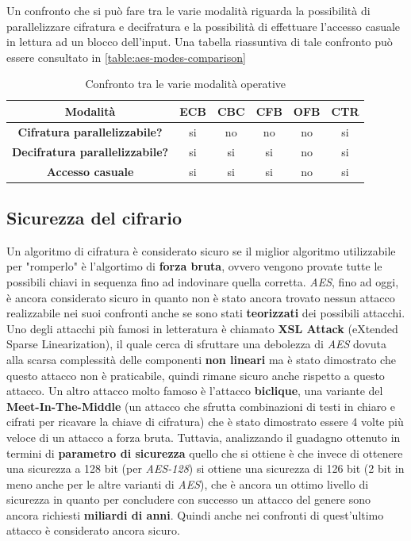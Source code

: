 \begin{itemize}
\end{itemize}

Un confronto che si può fare tra le varie modalità riguarda la possibilità di parallelizzare cifratura e decifratura e la possibilità di effettuare l'accesso casuale in lettura ad un blocco dell'input. Una tabella riassuntiva di tale confronto può essere consultato in \autoref{table:aes-modes-comparison} \cite{wikipedia_aes_modes}

\begin{table}[h]
    \centering
    \begin{tabular}[h]{| c || c | c | c | c | c |}
        \hline
        \textbf{Modalità} & \textbf{ECB} & \textbf{CBC} & \textbf{CFB} & \textbf{OFB} & \textbf{CTR} \\
        \hline
        \textbf{Cifratura parallelizzabile?} & si & no & no & no & si \\
        \hline
        \textbf{Decifratura parallelizzabile?} & si & si & si & no & si \\
        \hline
        \textbf{Accesso casuale} & si & si & si & no & si \\
        \hline
    \end{tabular}
    \caption{Confronto tra le varie modalità operative}
    \label{table:aes-modes-comparison}
\end{table}

\subsection{Sicurezza del cifrario}
Un algoritmo di cifratura è considerato sicuro se il miglior algoritmo utilizzabile per "romperlo" è l'algortimo di \textbf{forza bruta}, ovvero vengono provate tutte le possibili chiavi in sequenza fino ad indovinare quella corretta. \emph{AES}, fino ad oggi, è ancora considerato sicuro in quanto non è stato ancora trovato nessun attacco realizzabile nei suoi confronti anche se sono stati \textbf{teorizzati} dei possibili attacchi. Uno degli attacchi più famosi in letteratura è chiamato \textbf{XSL Attack} (eXtended Sparse Linearization), il quale cerca di sfruttare una debolezza di \emph{AES} dovuta alla scarsa complessità delle componenti \textbf{non lineari} ma è stato dimostrato che questo attacco non è praticabile, quindi rimane sicuro anche rispetto a questo attacco. Un altro attacco molto famoso è l'attacco \textbf{biclique}, una variante del \textbf{Meet-In-The-Middle} (un attacco che sfrutta combinazioni di testi in chiaro e cifrati per ricavare la chiave di cifratura) che è stato dimostrato essere 4 volte più veloce di un attacco a forza bruta. Tuttavia, analizzando il guadagno ottenuto in termini di \textbf{parametro di sicurezza} quello che si ottiene è che invece di ottenere una sicurezza a 128 bit (per \emph{AES-128}) si ottiene una sicurezza di 126 bit (2 bit in meno anche per le altre varianti di \emph{AES}), che è ancora un ottimo livello di sicurezza in quanto per concludere con successo un attacco del genere sono ancora richiesti \textbf{miliardi di anni}. Quindi anche nei confronti di quest'ultimo attacco è considerato ancora sicuro. \cite{wikipedia_aes}

